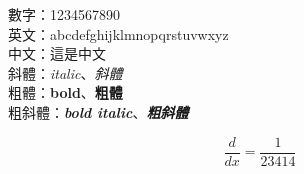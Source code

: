 \documentclass[12pt, a4papaer, AutoFakeBold, AutoFakeSlant]{article}
\begin{document}
\justifying

數字：1234567890\\
英文：abcdefghijklmnopqrstuvwxyz\\
中文：這是中文\\
斜體：\textit{italic}、\textit{斜體}\\
粗體：\textbf{bold}、\textbf{粗體}\\
粗斜體：\textbf{\textit{bold italic}}、\textbf{\textit{粗斜體}}


\[
	\frac{d}{dx} = \frac{1}{23414}
\]
\end{document}
